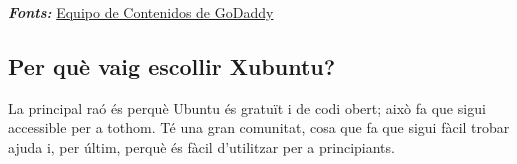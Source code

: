 \textit{\textbf{Fonts:}} \href{https://www.godaddy.com/resources/es/crearweb/que-es-ubuntu-y-para-que-sirve}{Equipo de Contenidos de GoDaddy}

\subsection{Per què vaig escollir Xubuntu?}
La principal raó és perquè Ubuntu és gratuït i de codi obert; això fa que sigui accessible per a tothom. Té una gran comunitat, cosa que fa que sigui fàcil trobar ajuda i, per últim, perquè és fàcil d’utilitzar per a principiants.





